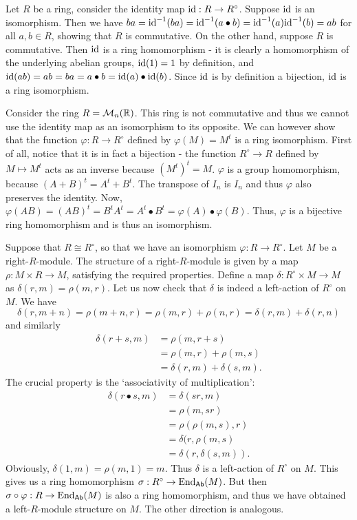 \begin{solution}
	Let $R$ be a ring, consider the identity map $\mathrm{id}: R \to R^\circ$. Suppose $\mathrm{id}$ is an isomorphism. Then we have $ba = \mathrm{id}^{-1}(ba) = \mathrm{id}^{-1}(a \bullet b) = \mathrm{id}^{-1}(a)\mathrm{id}^{-1}(b) = ab$ for all $a, b \in R$, showing that $R$ is commutative. On the other hand, suppose $R$ is commutative. Then $\mathrm{id}$ is a ring homomorphism - it is clearly a homomorphism of the underlying abelian groups, $\mathrm{id}(1) = 1$ by definition, and $\mathrm{id}(ab) = ab = ba = a \bullet b = \mathrm{id}(a) \bullet \mathrm{id}(b)$. Since $\mathrm{id}$ is by definition a bijection, $\mathrm{id}$ is a ring isomorphism.
	
	Consider the ring $R = \mathcal{M}_n(\mathbb{R})$. This ring is not commutative and thus we cannot use the identity map as an isomorphism to its opposite. We can however show that the function $\varphi: R \to R^\circ$ defined by $\varphi(M) = M^t$ is a ring isomorphism. First of all, notice that it is in fact a bijection - the function $R^\circ \to R$ defined by $M \mapsto M^t$ acts as an inverse because $(M^t)^t = M$. $\varphi$ is a group homomorphism, because $(A + B)^t = A^t + B^t$. The transpose of $I_n$ is $I_n$ and thus $\varphi$ also preserves the identity. Now, $\varphi(AB) = (AB)^t = B^t A^t = A^t \bullet B^t = \varphi(A) \bullet \varphi(B)$. Thus, $\varphi$ is a bijective ring homomorphism and is thus an isomorphism.
	
	Suppose that $R \cong R^\circ$, so that we have an isomorphism $\varphi: R \to R^\circ$. Let $M$ be a right-$R$-module. The structure of a right-$R$-module is given by a map $\rho: M \times R \to M$, satisfying the required properties. Define a map $\delta: R^\circ \times M \to M$ as $\delta(r, m) = \rho(m, r)$. Let us now check that $\delta$ is indeed a left-action of $R^\circ$ on $M$. We have
	\[
		\delta(r, m + n) = \rho(m + n, r) = \rho(m, r) + \rho(n, r) = \delta(r, m) + \delta(r, n)
	\]
	and similarly
	\begin{align*}
		\delta(r + s, m) &= \rho(m, r + s) \\
		&= \rho(m, r) + \rho(m, s) \\
		&= \delta(r, m) + \delta(s, m) \text{.}
	\end{align*}
	The crucial property is the `associativity of multiplication':
	\begin{align*}
		\delta(r \bullet s, m) &= \delta(sr, m) \\
		&= \rho(m, sr) \\
		&= \rho(\rho(m, s), r) \\
		&= \delta(r, \rho(m, s) \\
		&= \delta(r, \delta(s, m)) \text{.}
	\end{align*}
	Obviously, $\delta(1, m) = \rho(m, 1) = m$.
	Thus $\delta$ is a left-action of $R^\circ$ on $M$. This gives us a ring homomorphism $\sigma: R^\circ \to \mathrm{End}_{\mathsf{Ab}}(M)$. But then $\sigma \circ \varphi: R \to \mathrm{End}_{\mathsf{Ab}}(M)$ is also a ring homomorphism, and thus we have obtained a left-$R$-module structure on $M$. The other direction is analogous.
\end{solution}

